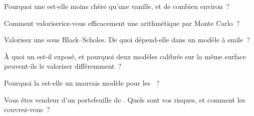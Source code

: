 \begin{interviewq}\label{iq:dv:asians-lookbacks-cliquets-and-forward-starts:1}
Pourquoi une  est-elle moins chère qu'une vanille, et de combien environ~?
\end{interviewq}

\begin{interviewq}\label{iq:dv:asians-lookbacks-cliquets-and-forward-starts:2}
Comment valoriseriez-vous efficacement une  arithmétique par Monte Carlo~?
\end{interviewq}

\begin{interviewq}\label{iq:dv:asians-lookbacks-cliquets-and-forward-starts:3}
Valorisez une  sous Black--Scholes. De quoi dépend-elle dans un modèle à smile~?
\end{interviewq}

\begin{interviewq}\label{iq:dv:asians-lookbacks-cliquets-and-forward-starts:4}
À quoi un  est-il exposé, et pourquoi deux modèles calibrés sur la même surface peuvent-ils le valoriser différemment~?
\end{interviewq}

\begin{interviewq}\label{iq:dv:asians-lookbacks-cliquets-and-forward-starts:5}
Pourquoi la  est-elle un mauvais modèle pour les ~?
\end{interviewq}

\begin{interviewq}\label{iq:dv:asians-lookbacks-cliquets-and-forward-starts:6}
Vous êtes vendeur d'un portefeuille de . Quels sont vos risques, et comment les couvrez-vous~?
\end{interviewq}
